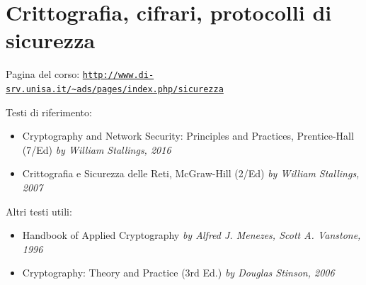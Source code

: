 \chapter{Crittografia, cifrari, protocolli di sicurezza}
Pagina del corso: \texttt{\url{http://www.di-srv.unisa.it/~ads/pages/index.php/sicurezza}}

\vspace{5mm}

\noindent Testi di riferimento:
\begin{itemize}
    \item Cryptography and Network Security: Principles and Practices, Prentice-Hall (7/Ed) \textit{by William Stallings, 2016}
    \item Crittografia e Sicurezza delle Reti, McGraw-Hill (2/Ed) \textit{by William Stallings, 2007}
\end{itemize}
Altri testi utili:
\begin{itemize}
    \item Handbook of Applied Cryptography \textit{by Alfred J. Menezes, Scott A. Vanstone, 1996 }
    \item Cryptography: Theory and Practice (3rd Ed.) \textit{by Douglas Stinson, 2006 }
\end{itemize}

